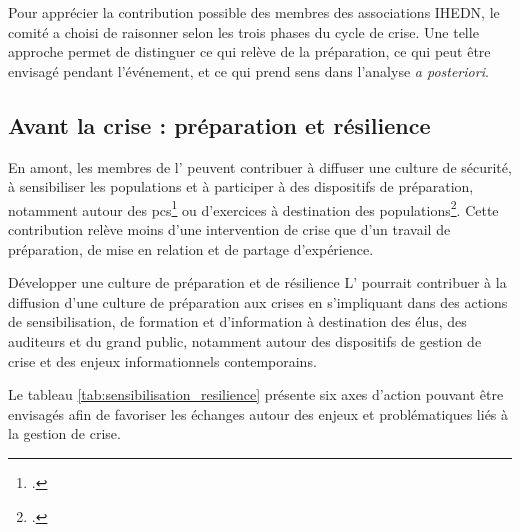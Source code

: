 Pour apprécier la contribution possible des membres des associations IHEDN, le comité a choisi de raisonner selon les trois phases du cycle de crise. Une telle approche permet de distinguer ce qui relève de la préparation, ce qui peut être envisagé pendant l'événement, et ce qui prend sens dans l'analyse \textit{a posteriori}.

\subsection{Avant la crise : préparation et résilience}

En amont, les membres de l'\ARSeize{} peuvent contribuer à diffuser une culture de sécurité, à sensibiliser les populations et à participer à des dispositifs de préparation, notamment autour des \gls{pcs}\footcite{PCS_PICS_def} ou d'exercices à destination des populations\footcite{Gestion_de_crise_def_exemples}. Cette contribution relève moins d'une intervention de crise que d'un travail de préparation, de mise en relation et de partage d'expérience.


\begin{proposition}{Développer une culture de préparation et de résilience}
L'\ARSeize{} pourrait contribuer à la diffusion d'une culture de préparation aux crises en s'impliquant dans des actions de sensibilisation, de formation et d'information à destination des élus, des auditeurs et du grand public, notamment autour des dispositifs de gestion de crise et des enjeux informationnels contemporains.
\end{proposition}

Le tableau \ref{tab:sensibilisation_resilience} présente six axes d'action pouvant être envisagés afin de favoriser les échanges autour des enjeux et problématiques liés à la gestion de crise.

